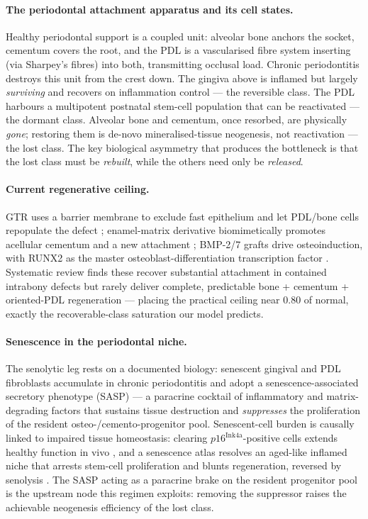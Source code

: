\documentclass[11pt,a4paper]{article}
\begin{document}
\paragraph{The periodontal attachment apparatus and its cell states.} Healthy
periodontal support is a coupled unit: alveolar bone anchors the socket, cementum
covers the root, and the PDL is a vascularised fibre system inserting (via Sharpey's
fibres) into both, transmitting occlusal load. Chronic periodontitis destroys this
unit from the crest down. The gingiva above is inflamed but largely \emph{surviving}
and recovers on inflammation control --- the reversible class. The PDL harbours a
multipotent postnatal stem-cell population \citep{seo2004} that can be reactivated ---
the dormant class. Alveolar bone and cementum, once resorbed, are physically
\emph{gone}; restoring them is de-novo mineralised-tissue neogenesis, not reactivation
--- the lost class. The key biological asymmetry that produces the bottleneck is that
the lost class must be \emph{rebuilt}, while the others need only be \emph{released}.

\paragraph{Current regenerative ceiling.} GTR uses a barrier membrane to exclude
fast epithelium and let PDL/bone cells repopulate the defect \citep{nyman1982};
enamel-matrix derivative biomimetically promotes acellular cementum and a new
attachment \citep{hammarstrom1997}; BMP-2/7 grafts \citep{wozney1988} drive
osteoinduction, with RUNX2 as the master osteoblast-differentiation transcription
factor \citep{komori2010}. Systematic review \citep{kao2015} finds these recover
substantial attachment in contained intrabony defects but rarely deliver complete,
predictable bone + cementum + oriented-PDL regeneration --- placing the practical
ceiling near $0.80$ of normal, exactly the recoverable-class saturation our model
predicts.

\paragraph{Senescence in the periodontal niche.} The senolytic leg rests on a
documented biology: senescent gingival and PDL fibroblasts accumulate in chronic
periodontitis and adopt a senescence-associated secretory phenotype (SASP)
\citep{coppe2010} --- a paracrine cocktail of inflammatory and matrix-degrading
factors that sustains tissue destruction and \emph{suppresses} the proliferation of
the resident osteo-/cemento-progenitor pool. Senescent-cell burden is causally
linked to impaired tissue homeostasis: clearing $p16^{\text{Ink4a}}$-positive cells
extends healthy function in vivo \citep{baker2016}, and a senescence atlas resolves
an aged-like inflamed niche that arrests stem-cell proliferation and blunts
regeneration, reversed by senolysis \citep{moiseeva2023}. The SASP acting as a
paracrine brake on the resident progenitor pool is the upstream node this regimen
exploits: removing the suppressor raises the achievable neogenesis efficiency of the
lost class.
\end{document}
